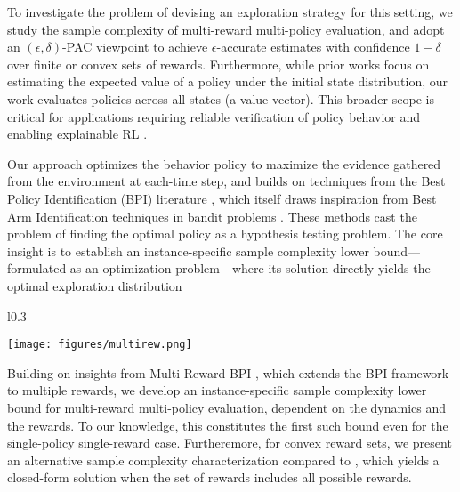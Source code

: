 To investigate the problem of devising an exploration strategy for this setting, we study the sample complexity of multi-reward multi-policy evaluation, and adopt an $(\epsilon,\delta)$-PAC viewpoint to achieve $\epsilon$-accurate estimates with confidence $1-\delta$ over finite or convex sets of rewards.  Furthermore, while prior works focus on estimating the expected value of a policy under the initial state distribution, our work evaluates policies across all states (a value vector). This broader scope is critical for applications requiring reliable verification of policy behavior and enabling explainable RL \cite{puiutta2020explainable,ruggeri2025explainable}.

 Our approach optimizes the behavior policy to maximize the evidence  gathered from the environment at each-time step, and builds on techniques from the Best Policy Identification (BPI) literature \cite{al2021navigating}, which itself draws inspiration from Best Arm Identification techniques in bandit problems \cite{garivier2016optimal,kaufmann2016complexity}. These methods cast the problem of finding the optimal policy as a hypothesis testing problem. The core insight is to establish an instance-specific sample complexity lower bound—formulated as an optimization problem—where its solution directly yields the optimal exploration distribution

\setlength{\intextsep}{0pt}%
\setlength{\columnsep}{3pt}%
\begin{wrapfigure}{l}{0.3\linewidth}
  \begin{center}
    \texttt{[image: figures/multirew.png]}
  \end{center}
\end{wrapfigure} 
Building on insights from Multi-Reward BPI \cite{russomulti}, which extends the BPI framework to multiple rewards, we develop an instance-specific sample complexity lower bound for multi-reward multi-policy evaluation, dependent on the dynamics and the rewards. To our knowledge, this constitutes the first such bound even for the single-policy single-reward case.
Furtheremore, for convex reward sets, we present an alternative sample complexity characterization compared to \cite{russomulti}, which yields a closed-form solution when the set of rewards includes all possible rewards. 

